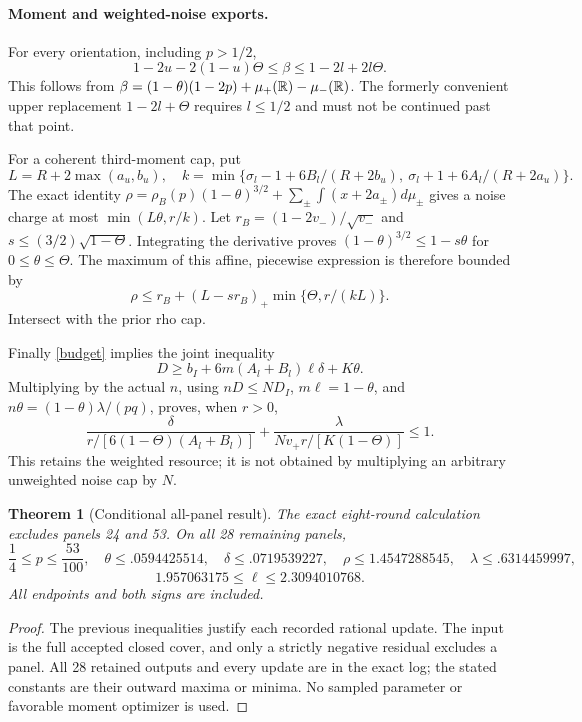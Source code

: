 \documentclass[10pt]{article}
\newtheorem{theorem}{Theorem}\newtheorem{lemma}{Lemma}
\begin{document}
\paragraph{Moment and weighted-noise exports.}
For every orientation, including \(p>1/2\),
\begin{equation}\label{beta}
 1-2u-2(1-u)\Theta\le\beta\le1-2l+2l\Theta.
\end{equation}
This follows from
\(\beta=(1-\theta)(1-2p)+\mu_+(\mathbb R)-\mu_-(\mathbb R)\).
The formerly convenient upper replacement \(1-2l+\Theta\) requires
\(l\le1/2\) and must not be continued past that point.

For a coherent third-moment cap, put
\[
 L=R+2\max(a_u,b_u),\quad
 k=\min\{\sigma_l-1+6B_l/(R+2b_u),\
          \sigma_l+1+6A_l/(R+2a_u)\}.
\]
The exact identity
\(\rho=\rho_B(p)(1-\theta)^{3/2}+\sum_\pm\int(x+2a_\pm)d\mu_\pm\)
gives a noise charge at most \(\min(L\theta,r/k)\).
Let \(r_B=(1-2v_-)/\sqrt{v_-}\) and
\(s\le(3/2)\sqrt{1-\Theta}\). Integrating the derivative proves
\((1-\theta)^{3/2}\le1-s\theta\) for \(0\le\theta\le\Theta\).
The maximum of this affine, piecewise expression is therefore bounded by
\[
 \rho\le r_B+(L-sr_B)_+\min\{\Theta,r/(kL)\}.
\]
Intersect with the prior rho cap.

Finally \eqref{budget} implies the joint inequality
\[
 D\ge b_I+6m(A_l+B_l)\ell\delta+K\theta.
\]
Multiplying by the actual \(n\), using \(nD\le ND_I\),
\(m\ell=1-\theta\), and \(n\theta=(1-\theta)\lambda/(pq)\),
proves, when \(r>0\),
\[
 \frac{\delta}{r/[6(1-\Theta)(A_l+B_l)]}
 +\frac{\lambda}{Nv_+r/[K(1-\Theta)]}\le1.
\]
This retains the weighted resource; it is not obtained by multiplying an
arbitrary unweighted noise cap by \(N\).

\begin{theorem}[Conditional all-panel result]
The exact eight-round calculation excludes panels 24 and 53.
On all 28 remaining panels,
\[
 \frac14\le p\le\frac{53}{100},\quad
 \theta\le.0594425514,\quad \delta\le.0719539227,\quad
 \rho\le1.4547288545,\quad \lambda\le.6314459997,
\]
\[
 1.957063175\le\ell\le2.3094010768.
\]
All endpoints and both signs are included.
\end{theorem}
\begin{proof}
The previous inequalities justify each recorded rational update.
The input is the full accepted closed cover, and only a strictly negative
residual excludes a panel. All 28 retained outputs and every update are in
the exact log; the stated constants are their outward maxima or minima.
No sampled parameter or favorable moment optimizer is used.
\end{proof}
\end{document}
